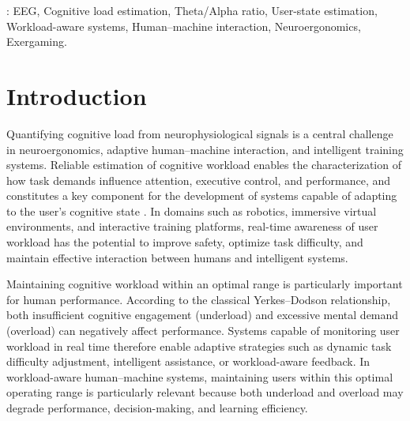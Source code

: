 \documentclass[10pt]{iopart}
\begin{document}
%
\vspace{2pc}
: EEG, Cognitive load estimation, Theta/Alpha ratio, User-state estimation, Workload-aware systems, Human--machine interaction, Neuroergonomics, Exergaming.
%
%
% 
%


\ioptwocol

\maketitle


\section{Introduction}
\label{sec:intro}

Quantifying cognitive load from neurophysiological signals is a
central challenge in neuroergonomics, adaptive human--machine
interaction, and intelligent training systems. Reliable estimation
of cognitive workload enables the characterization of how task
demands influence attention, executive control, and performance,
and constitutes a key component for the development of systems
capable of adapting to the user's cognitive state \cite{24}. In
domains such as robotics, immersive virtual environments, and
interactive training platforms, real-time awareness of user
workload has the potential to improve safety, optimize task
difficulty, and maintain effective interaction between humans and
intelligent systems.

Maintaining cognitive workload within an optimal range is
particularly important for human performance. According to the
classical Yerkes--Dodson relationship, both insufficient cognitive
engagement (underload) and excessive mental demand (overload) can
negatively affect performance. Systems capable of monitoring user
workload in real time therefore enable adaptive strategies such as
dynamic task difficulty adjustment, intelligent assistance, or
workload-aware feedback. In workload-aware human--machine systems,
maintaining users within this optimal operating range is
particularly relevant because both underload and overload may
degrade performance, decision-making, and learning efficiency.
\end{document}
